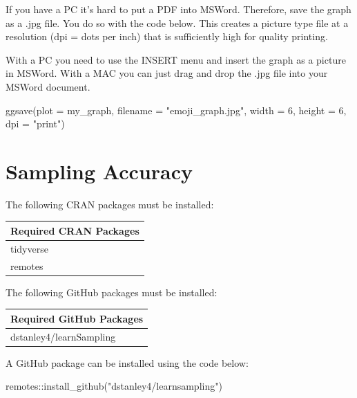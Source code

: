 \documentclass[
]{krantz}
\makeatletter
\newenvironment{Shaded}{\begin{snugshade}}{\end{snugshade}}
\newcommand{\AttributeTok}[1]{\textcolor[rgb]{0.61,0.61,0.61}{#1}}
\newcommand{\DecValTok}[1]{\textcolor[rgb]{0.06,0.06,0.06}{#1}}
\newcommand{\FunctionTok}[1]{\textcolor[rgb]{0,0,0}{#1}}
\newcommand{\NormalTok}[1]{#1}
\newcommand{\SpecialCharTok}[1]{\textcolor[rgb]{0,0,0}{#1}}
\newcommand{\StringTok}[1]{\textcolor[rgb]{0.5,0.5,0.5}{#1}}
\newenvironment{kframe}{%
\medskip{}
\setlength{\fboxsep}{.8em}
 \def\at@end@of@kframe{}%
 \ifinner\ifhmode%
  \def\at@end@of@kframe{\end{minipage}}%
  \begin{minipage}{\columnwidth}%
 \fi\fi%
 \def\FrameCommand##1{\hskip\@totalleftmargin \hskip-\fboxsep
 \colorbox{shadecolor}{##1}\hskip-\fboxsep
     \hskip-\linewidth \hskip-\@totalleftmargin \hskip\columnwidth}%
 \MakeFramed {\advance\hsize-\width
   \@totalleftmargin\z@ \linewidth\hsize
   \@setminipage}}%
 {\par\unskip\endMakeFramed%
 \at@end@of@kframe}
\renewenvironment{Shaded}{\begin{kframe}}{\end{kframe}}
\makeatother
\begin{document}
If you have a PC it's hard to put a PDF into MSWord. Therefore, save the graph as a .jpg file. You do so with the code below. This creates a picture type file at a resolution (dpi = dots per inch) that is sufficiently high for quality printing.

With a PC you need to use the INSERT menu and insert the graph as a picture in MSWord. With a MAC you can just drag and drop the .jpg file into your MSWord document.

\begin{Shaded}
\begin{Highlighting}[]
\FunctionTok{ggsave}\NormalTok{(}\AttributeTok{plot =}\NormalTok{ my\_graph, }
       \AttributeTok{filename =} \StringTok{"emoji\_graph.jpg"}\NormalTok{, }
       \AttributeTok{width =} \DecValTok{6}\NormalTok{, }
       \AttributeTok{height =} \DecValTok{6}\NormalTok{, }
       \AttributeTok{dpi =} \StringTok{"print"}\NormalTok{)}
\end{Highlighting}
\end{Shaded}

\hypertarget{sampling-accuracy}{%
\chapter{Sampling Accuracy}\label{sampling-accuracy}}

The following CRAN packages must be installed:

\begin{longtable}[]{@{}l@{}}
\toprule
Required CRAN Packages \\
\midrule
\endhead
tidyverse \\
remotes \\
\bottomrule
\end{longtable}

The following GitHub packages must be installed:

\begin{longtable}[]{@{}l@{}}
\toprule
Required GitHub Packages \\
\midrule
\endhead
dstanley4/learnSampling \\
\bottomrule
\end{longtable}

A GitHub package can be installed using the code below:

\begin{Shaded}
\begin{Highlighting}[]
\NormalTok{remotes}\SpecialCharTok{::}\FunctionTok{install\_github}\NormalTok{(}\StringTok{"dstanley4/learnsampling"}\NormalTok{)}
\end{Highlighting}
\end{Shaded}
\end{document}
